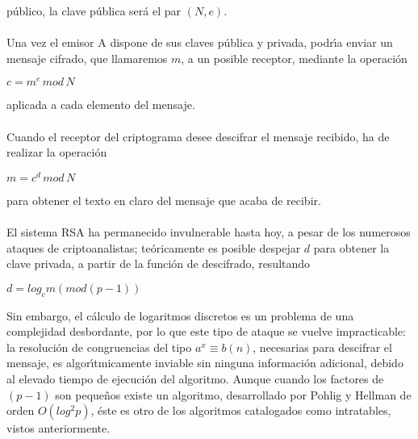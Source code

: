p\'ublico, la clave p\'ublica ser\'a el par $(N,e)$.\\
\\Una vez el emisor A dispone de sus claves p\'ublica y privada,
podr\'{\i}a enviar un mensaje cifrado, que llamaremos $m$, a un posible
receptor, mediante la operaci\'on
\begin{center}
$c=m^{e}\,mod\,N$
\end{center}
aplicada a cada elemento del mensaje.\\
\\Cuando el receptor del criptograma desee descifrar el mensaje recibido, ha
de realizar la operaci\'on
\begin{center}
$m=c^{d}\,mod\,N$
\end{center}
para obtener el texto en claro del mensaje que acaba de recibir.\\
\\El sistema RSA ha permanecido invulnerable hasta hoy, a pesar de los
numerosos ataques de criptoanalistas; te\'oricamente es posible despejar
$d$ para obtener la clave privada, a partir de la funci\'on de descifrado,
resultando
\begin{center}
$d=log_{c} m(mod(p-1))$
\end{center}
Sin embargo, el c\'alculo de logaritmos discretos es un problema
de una complejidad desbordante, por lo que este tipo de ataque se vuelve
impracticable: la resoluci\'on de congruencias del tipo 
$a^{x}\equiv b(n)$, necesarias
para descifrar el mensaje, es algor\'{\i}tmicamente inviable sin ninguna
informaci\'on adicional, debido al elevado tiempo de ejecuci\'on
del algoritmo. Aunque cuando los factores de $(p-1)$ son peque\~nos existe
un algoritmo, desarrollado por Pohlig y Hellman de orden $O(log^{2} p)$, \'este
es otro de los algoritmos catalogados como intratables, vistos anteriormente.
